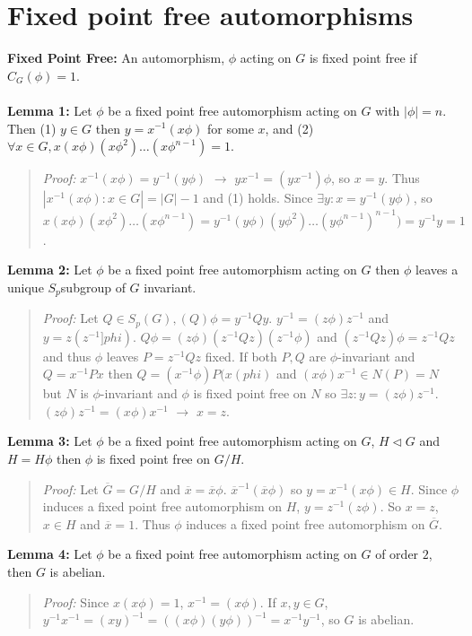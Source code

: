 \section {Fixed point free automorphisms} 
{\bf Fixed Point Free:}  An automorphism, $\phi$ acting on $G$ is fixed point free if $C_G(\phi) =1$.
\\
\\
{\bf Lemma 1:} Let $\phi$ be a fixed point free automorphism acting on $G$ with $|\phi|=n$.  Then
(1) $y \in G$ then $y= x^{-1}(x \phi)$ for some $x$, and 
(2) $\forall x \in G, x(x \phi) (x \phi^2) \ldots (x \phi^{n-1}) = 1$.
\begin{quote}
\emph{Proof:}  
$x^{-1}(x\phi) = y^{-1}(y\phi)$ $\rightarrow$ $y x^{-1} = (y x^{-1})\phi$, so $x=y$.  Thus
$|{x^{-1}(x\phi): x \in G}| = |G|-1$ and (1) holds. Since $\exists y: x= y^{-1}(y\phi)$, so
$x(x \phi) (x \phi^2) \ldots (x \phi^{n-1}) =
y^{-1}(y \phi) (y \phi^2) \ldots (y \phi^{n-1})^{n-1}) = y^{-1}y = 1$.
\end{quote}
{\bf Lemma 2:} Let $\phi$ be a fixed point free automorphism acting on $G$ then $\phi$ leaves a unique
$S_p$subgroup of $G$ invariant.
\begin{quote}
\emph{Proof:}  
Let $Q \in S_p(G), (Q)\phi = y^{-1}Qy$.  $y^{-1}= (z\phi)z^{-1}$ and $y = z(z^{-1}]phi)$.
$Q\phi = (z\phi) (z^{-1}Q z) (z^{-1}\phi)$ and $(z^{-1}Qz)\phi= z^{-1}Qz$ and thus
$\phi$ leaves $P=z^{-1}Qz$ fixed.  If both $P, Q$ are $\phi$-invariant and 
$Q=x^{-1}Px$ then
$Q=(x^{-1}\phi)P(x(phi)$ and $(x\phi)x^{-1} \in N(P) = N$ but $N$ is $\phi$-invariant and
$\phi$ is fixed point free on $N$ so $\exists z: y=(z\phi)z^{-1}$.
$(z\phi)z^{-1}=
(x\phi)x^{-1}$ $\rightarrow$ $x=z$.
\end{quote}
{\bf Lemma 3:} Let $\phi$ be a fixed point free automorphism acting on $G$, $H \lhd G$ and $H= H\phi$ then
$\phi$ is fixed point free on $G/H$.
\begin{quote}
\emph{Proof:}  
Let ${\overline G} = G/H$ and ${\overline x} = {\overline x}\phi$.  ${\overline x}^{-1}({\overline x}\phi)$
so $y= x^{-1}(x\phi) \in H$.  Since $\phi$ induces a fixed point free automorphism on $H$, $y= z^{-1}(z\phi)$.
So $x = z$, $x \in H$ and ${\overline x} = 1$.  Thus $\phi$ induces a fixed point free automorphism on
${\overline G}$.
\end{quote}
{\bf Lemma 4:} Let $\phi$ be a fixed point free automorphism acting on $G$ of order $2$, then $G$ is abelian.
\begin{quote}
\emph{Proof:}  
Since $x(x\phi) = 1$, $x^{-1} = (x\phi)$.  If 
$x, y \in G$, $y^{-1}x^{-1} = (xy)^{-1}= ((x\phi)(y\phi))^{-1} = x^{-1} y^{-1}$, so $G$ is abelian.
\end{quote}
